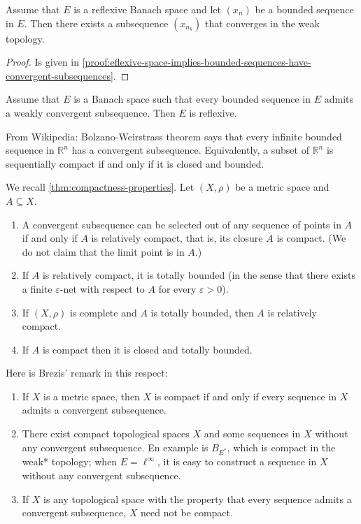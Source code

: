 \documentclass{article}
\theoremstyle{definition}
\numberwithin{equation}{section}
\newcommand{\R}{\mathbb{R}}
\begin{document}
\begin{thm}\label{thm:reflexive-space-implies-bounded-sequences-have-convergent-subsequences}
	Assume that $E$ is a reflexive Banach space and let $(x_n)$ be a bounded sequence in $E$. Then there exists a subsequence $(x_{n_k})$ that converges in the weak topology.
\end{thm}
\begin{proof}
	Is given in \cref{proof:eflexive-space-implies-bounded-sequences-have-convergent-subsequences}.
\end{proof}
\begin{thm}
	Assume that $E$ is a Banach space such that every bounded sequence in $E$ admits a weakly convergent subsequence. Then $E$ is reflexive.
\end{thm}
\begin{remark}
	From Wikipedia: Bolzano-Weirstrass theorem says that every infinite bounded sequence in $\R^n$ has a convergent subsequence. Equivalently, a subset of $\R^n$ is sequentially compact if and only if it is closed and bounded.
\end{remark}
\begin{remark}
	We recall \cref{thm:compactness-properties}. Let $(X,\rho)$ be a metric space and $A\subseteq X$.
	\begin{enumerate}
		\item A convergent subsequence can be selected out of any sequence of points in $A$ if and only if $A$ is relatively compact, that is, its closure $\overline{A}$ is compact. (We do not claim that the limit point is in $A$.)
		\item If $A$ is relatively compact, it is totally bounded (in the sense that there exists a finite $\varepsilon$-net with respect to $A$ for every $\varepsilon>0$).
		\item If $(X,\rho)$ is complete and $A$ is totally bounded, then $A$ is relatively compact. 
		\item If $A$ is compact then it is closed and totally bounded.
	\end{enumerate}
\end{remark}
\begin{remark}Here is Brezis' remark in this respect:
	\begin{enumerate}
		\item If $X$ is a metric space, then $X$ is compact if and only if every sequence in $X$ admits a convergent subsequence.
		\item There exist compact topological spaces $X$ and some sequences in $X$ without any convergent subsequence. En example is $B_{E^*}$, which is compact in the weak* topology; when $E=\ell^\infty$, it is easy to construct a sequence in $X$ without any convergent subsequence.
		\item If $X$ is any topological space with the property that every sequence admits a convergent subsequence, $X$ need not be compact.	
	\end{enumerate}
\end{remark}
\end{document}
